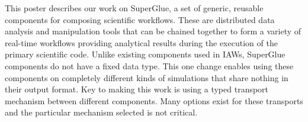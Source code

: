 \documentclass[conference]{IEEEtran}
\begin{document}
This poster describes our work on SuperGlue, a set of generic, reusable
components for composing scientific workflows. These are distributed data
analysis and manipulation tools that can be chained together to form a variety
of real-time workflows providing analytical results during the execution of the
primary scientific code.  Unlike existing components used in IAWs, SuperGlue
components do not have a fixed data type.  This one change enables using these
components on completely different kinds of simulations that share nothing in
their output format. Key to making this work is using a typed transport
mechanism between different components. Many options exist for these transports
and the particular mechanism selected is not critical. 

%

\end{document}
